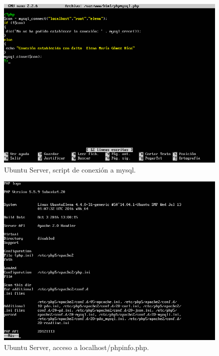 \begin{figure}[H] 
	\centering
	\includegraphics[width=15cm]{./img/ejercicio9e.png} 	
	\caption{Ubuntu Server, script de conexión a mysql.} \label{fig:ejercicio9e}
\end{figure}


\begin{figure}[H] 
	\centering
	\includegraphics[width=15cm]{./img/ejercicio9i.png} 	
	\caption{Ubuntu Server, acceso a localhost/phpinfo.php.} \label{fig:ejercicio9i}
\end{figure}



